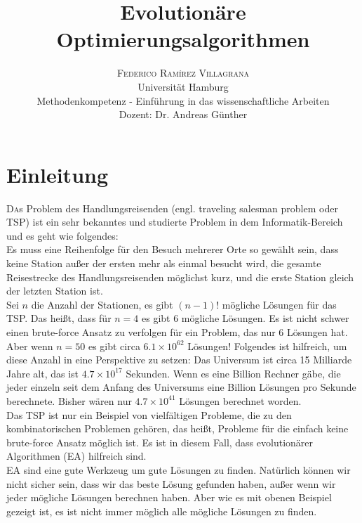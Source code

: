 \documentclass[twoside,twocolumn]{article}
\title{Evolutionäre Optimierungsalgorithmen} %
\author{
	\textsc{Federico Ramírez Villagrana} \\[1ex]
	\normalsize Universität Hamburg \\
	\normalsize Methodenkompetenz - Einführung in das wissenschaftliche Arbeiten \\
	\normalsize Dozent: Dr. Andreas Günther
}
\date{} %
\newcommand{\e}[1]{\times 10^{#1}}
\begin{document}
\maketitle


\section{Einleitung}

\lettrine[nindent=0em,lines=3]{D} as Problem des Handlungsreisenden (engl. traveling salesman problem oder TSP) ist ein sehr bekanntes und studierte Problem in dem Informatik-Bereich und es geht wie folgendes:\\
Es muss eine Reihenfolge für den Besuch mehrerer Orte so gewählt sein, dass keine Station außer der ersten mehr als einmal besucht wird, die gesamte Reisestrecke des Handlungsreisenden möglichst kurz, und die erste Station gleich der letzten Station ist. \cite{wiki_tsp}\\
Sei $n$ die Anzahl der Stationen, es gibt $(n-1)!$ mögliche Lösungen für das TSP. Das heißt, dass für $n=4$ es gibt $6$ mögliche Lösungen. Es ist nicht schwer einen brute-force Ansatz zu verfolgen für ein Problem, das nur 6 Lösungen hat. Aber wenn $n=50$ es gibt circa $6.1\e{62}$ Lösungen! Folgendes ist hilfreich, um diese Anzahl in eine Perspektive zu setzen: Das Universum ist circa 15 Milliarde Jahre alt, das ist $4.7\e{17}$ Sekunden. Wenn es eine Billion Rechner gäbe, die jeder einzeln seit dem Anfang des Universums eine Billion Lösungen pro Sekunde berechnete. Bisher wären nur $4.7\e{41}$ Lösungen berechnet worden.\\
Das TSP ist nur ein Beispiel von vielfältigen Probleme, die zu den kombinatorischen Problemen gehören, das heißt, Probleme für die einfach keine brute-force Ansatz möglich ist. Es ist in diesem Fall, dass evolutionärer Algorithmen (EA) hilfreich sind.\\
EA sind eine gute Werkzeug um gute Lösungen zu finden. Natürlich können wir nicht sicher sein, dass wir das beste Lösung gefunden haben, außer wenn wir jeder mögliche Lösungen berechnen haben. Aber wie es mit obenen Beispiel gezeigt ist, es ist nicht immer möglich alle mögliche Lösungen zu finden.

\end{document}
